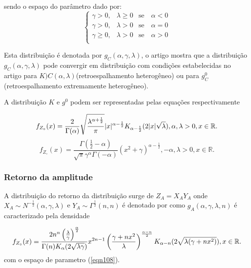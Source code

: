 \documentclass[12pt,a4paper]{article}
\begin{document}
sendo o espaço do parâmetro dado por:
\begin{equation}\label{eqn108}
	\left\{
\begin{array}{ccr}
	\gamma>0,&\lambda\geq 0&\mbox{se}\quad\alpha<0 \\
	\gamma>0,&\lambda > 0&\mbox{se}\quad\alpha=0 \\
	\gamma\geq0,&\lambda> 0&\mbox{se}\quad\alpha>0 \\
\end{array}
\right.
\end{equation}

Esta distribuição é denotada por $g_{C}(\alpha,\gamma,\lambda)$, o artigo mostra que a distribuição $g_{C}(\alpha,\gamma,\lambda)$ pode convergir em distribuição com condições estabelecidas no artigo para $K){C}(\alpha,\lambda)$(retroespalhamento heterogêneo) ou para $g_{C}^{0}$ (retroespalhamento extremamente heterogêneo).

A distribuição $K$ e $g^0$ podem ser representadas pelas equações respectivamente

\begin{equation}\label{eqn109}
	f_{Z_{\circ}}(x)=\frac{2}{\Gamma(\alpha)}\sqrt{\frac{\lambda^{\alpha+\frac{1}{2}}}{\pi}} |x|^{\alpha-\frac{1}{2}}K_{\alpha-\frac{1}{2}}(2|x|\sqrt{\lambda}), \alpha,\lambda>0, x\in\mathbb{R}. \\
\end{equation}
\begin{equation}\label{eqn110}
	f_{Z_{\circ}}(x)=\frac{\Gamma(\frac{1}{2}-\alpha)}{\sqrt{\pi}\gamma^{\alpha}\Gamma(-\alpha)}\left(x^2+\gamma\right)^{\alpha-\frac{1}{2}}, -\alpha,\lambda>0, x\in\mathbb{R}. 
\end{equation}

\subsubsection{Retorno da amplitude}

A distribuição do retorno da distribuição surge de $Z_{A}=X_{A}Y_{A}$ onde $X_{A}\sim N^{-\frac{1}{2}}(\alpha,\gamma,\lambda)$  e $Y_{A}\sim\Gamma^{\frac{1}{2}}(n,n)$ é denotado por como $g_{A}(\alpha,\gamma,\lambda,n)$ é caracterizado pela densidade  

\begin{equation}\label{eqn111}
	f_{Z_{\circ}}(x)=\frac{2n^n\left(\frac{\lambda}{\gamma}\right)^{\frac{\alpha}{2}}}{\Gamma(n)K_{\alpha}(2\sqrt{\lambda\gamma})}x^{2n-1}\left(\frac{\gamma+nx^2}{\lambda}\right)^{\frac{\alpha-n}{2}}K_{\alpha-n}(2\sqrt{\lambda(\gamma+nx^2)}), x\in\mathbb{R}. \\
\end{equation}
com o espaço de parametro (\ref{eqn108}).
\end{document}
